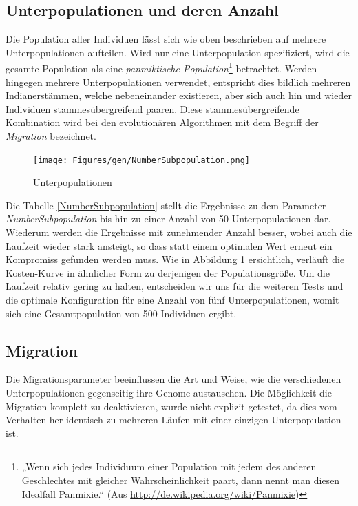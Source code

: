 \subsection{Unterpopulationen und deren Anzahl}
Die Population aller Individuen
lässt sich wie oben beschrieben auf mehrere Unterpopulationen aufteilen.
Wird nur eine Unterpopulation spezifiziert, wird die gesamte Population als
eine \emph{panmiktische Population}\footnote{„Wenn sich jedes Individuum
einer Population mit jedem des anderen Geschlechtes mit gleicher
Wahrscheinlichkeit paart, dann nennt man diesen Idealfall Panmixie.“
(Aus \url{http://de.wikipedia.org/wiki/Panmixie})} betrachtet.
Werden hingegen mehrere Unterpopulationen
verwendet, entspricht dies bildlich mehreren Indianerstämmen, welche nebeneinander
existieren, aber sich auch hin und wieder Individuen stammesübergreifend paaren.
Diese stammesübergreifende Kombination wird bei den evolutionären Algorithmen
mit dem Begriff der \emph{Migration} bezeichnet.



\begin{figure}[h!]
  \centering
  \texttt{[image: Figures/gen/NumberSubpopulation.png]}
  \caption{Unterpopulationen}\label{fig.numbersubpopulation}
\end{figure}

Die Tabelle \ref{NumberSubpopulation} stellt die Ergebnisse zu dem Parameter
\emph{NumberSubpopulation} bis hin zu einer Anzahl von 50 Unterpopulationen dar.
Wiederum werden die Ergebnisse mit zunehmender Anzahl besser, wobei auch
die Laufzeit wieder stark ansteigt, so dass statt einem optimalen Wert erneut
ein Kompromiss gefunden werden muss.
Wie in Abbildung \ref{fig.numbersubpopulation} ersichtlich, verläuft die
Kosten-Kurve in ähnlicher Form zu derjenigen der Populationsgröße. Um die
Laufzeit relativ gering zu halten, entscheiden wir uns für die weiteren Tests
und die optimale Konfiguration für eine Anzahl von fünf Unterpopulationen, womit
sich eine Gesamtpopulation von 500 Individuen ergibt.


\subsection{Migration}
Die Migrationsparameter beeinflussen die Art und Weise,
wie die verschiedenen Unterpopulationen gegenseitig ihre Genome austauschen.
Die Möglichkeit die Migration komplett zu deaktivieren, wurde nicht explizit
getestet, da dies vom Verhalten her identisch zu mehreren Läufen mit einer
einzigen Unterpopulation ist.

